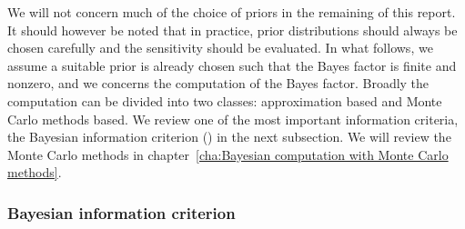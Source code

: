 We will not concern much of the choice of priors in the remaining of this
report. It should however be noted that in practice, prior distributions
should always be chosen carefully and the sensitivity should be evaluated. In
what follows, we assume a suitable prior is already chosen such that the Bayes
factor is finite and nonzero, and we concerns the computation of the Bayes
factor. Broadly the computation can be divided into two classes: approximation
based and Monte Carlo methods based. We review one of the most important
information criteria, the Bayesian information criterion (\bic) in the next
subsection. We will review the Monte Carlo methods in
chapter~\ref{cha:Bayesian computation with Monte Carlo methods}.

\subsubsection{Bayesian information criterion}
\label{ssub:Bayesian information criterion}


